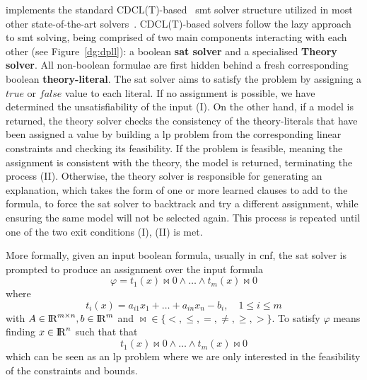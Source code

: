 \documentclass[runningheads]{llncs}
\begin{document}
\dlinear implements the standard CDCL(T)-based~\cite{ref:dpll-t} \gls{smt} solver structure utilized in most other state-of-the-art solvers~\cite{ref:cvc5}.
CDCL(T)-based solvers follow the lazy approach to \gls{smt} solving, being comprised of two main components interacting with each other (see Figure~\ref{dg:dpll}): a boolean \textbf{\gls{sat} solver} and a specialised \textbf{Theory solver}.
All non-boolean formulae are first hidden behind a fresh corresponding boolean \textbf{theory-literal}.
The \gls{sat} solver aims to satisfy the problem by assigning a $true$ or $false$ value to each literal.
If no assignment is possible, we have determined the unsatisfiability of the input (I).
On the other hand, if a model is returned, the theory solver checks the consistency of the theory-literals that have been assigned a value by building a \gls{lp} problem from the corresponding linear constraints and checking its feasibility.
If the problem is feasible, meaning the assignment is consistent with the theory, the model is returned, terminating the process (II).
Otherwise, the theory solver is responsible for generating an explanation, which takes the form of one or more learned clauses to add to the formula, to force the \gls{sat} solver to backtrack and try a different assignment, while ensuring the same model will not be selected again.
This process is repeated until one of the two exit conditions (I), (II) is met.


More formally, given an input boolean formula, usually in \gls{cnf}, the \gls{sat} solver is prompted to produce an assignment over the input formula
\begin{equation} %
    \label{eq:smt-formula}
    \varphi = t_1(x) \bowtie 0 \wedge \ldots \wedge t_m (x) \bowtie 0
\end{equation}
where
\begin{equation*}
    t_i(x) = a_{i1}x_1 + \ldots + a_{in}x_n - b_i, \quad 1 \le i \le m
\end{equation*}
with $A \in {\rm I\!R}^{m \times n}, b \in {\rm I\!R}^m$ and $\bowtie \in \{<, \le, =, \ne, \ge, >\}$.
To satisfy $\varphi$ means finding $x \in {\rm I\!R}^n $ such that that
\begin{equation*}
    t_1(x) \bowtie 0 \wedge \ldots \wedge t_m(x) \bowtie 0
\end{equation*}
which can be seen as an \gls{lp} problem where we are only interested in the feasibility of the constraints and bounds.
\end{document}
